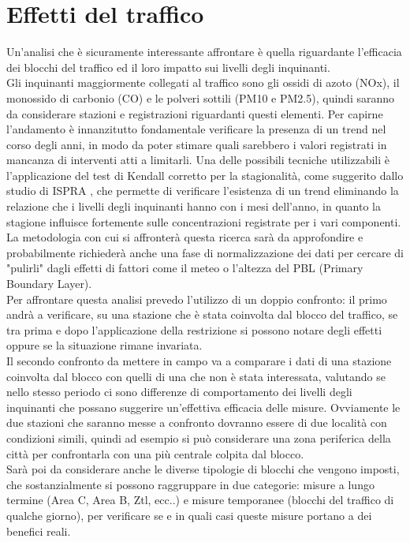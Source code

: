 \documentclass{article}
\begin{document}
\newpage

\section{Effetti del traffico}
Un'analisi che è sicuramente interessante affrontare è quella riguardante l'efficacia dei blocchi del traffico ed il loro impatto sui livelli degli inquinanti. 
\\Gli inquinanti maggiormente collegati al traffico sono gli ossidi di azoto (NOx), il monossido di carbonio (CO) e le polveri sottili (PM10 e PM2.5), quindi saranno da considerare stazioni e registrazioni riguardanti questi elementi.
Per capirne l'andamento è innanzitutto fondamentale verificare la presenza di un trend nel corso degli anni, in modo da poter stimare quali sarebbero i valori registrati in mancanza di interventi atti a limitarli. Una delle possibili tecniche utilizzabili è l'applicazione del test di Kendall corretto per la stagionalità, come suggerito dallo studio di ISPRA \cite{cattani2014analisi}, che permette di verificare l'esistenza di un trend eliminando la relazione che i livelli degli inquinanti hanno con i mesi dell'anno, in quanto la stagione influisce fortemente sulle concentrazioni registrate per i vari componenti.   
\\La metodologia con cui si affronterà questa ricerca sarà da approfondire e probabilmente richiederà anche una fase di normalizzazione dei dati per cercare di "pulirli" dagli effetti di fattori come il meteo o l'altezza del PBL (Primary Boundary Layer). 
\\Per affrontare questa analisi prevedo l'utilizzo di un doppio confronto: il primo andrà a verificare, su una stazione che è stata coinvolta dal blocco del traffico, se tra prima e dopo l'applicazione della restrizione si possono notare degli effetti oppure se la situazione rimane invariata.
\\Il secondo confronto da mettere in campo va a comparare i dati di una stazione coinvolta dal blocco con quelli di una che non è stata interessata, valutando se nello stesso periodo ci sono differenze di comportamento dei livelli degli inquinanti che possano suggerire un'effettiva efficacia delle misure. Ovviamente le due stazioni che saranno messe a confronto dovranno essere di due località con condizioni simili, quindi ad esempio si può considerare una zona periferica della città per confrontarla con una più centrale colpita dal blocco. 
\\Sarà poi da considerare anche le diverse tipologie di blocchi che vengono imposti, che sostanzialmente si possono raggruppare in due categorie: misure a lungo termine (Area C, Area B, Ztl, ecc..) e misure temporanee (blocchi del traffico di qualche giorno), per verificare se e in quali casi queste misure portano a dei benefici reali. 
\end{document}
